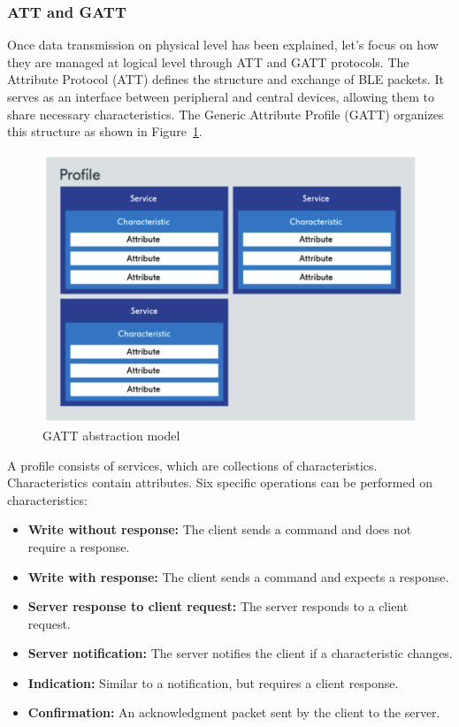 \documentclass{Configuration_Files/PoliMi3i_thesis}
\begin{document}
\subsubsection{ATT and GATT}

Once data transmission on physical level has been explained, let's focus on how they are managed at logical level through ATT and GATT protocols.
The Attribute Protocol (ATT) defines the structure and exchange of BLE packets. It serves as an interface between peripheral and central devices, allowing them to share necessary characteristics. The Generic Attribute Profile (GATT) organizes this structure as shown in Figure~\ref{gatt_model}. 

\begin{figure}[h]
    \centering
    \includegraphics[width=\linewidth]{Bluetooth Low Energy/Screenshot 2024-08-15 at 23.26.01.png}
    \caption{GATT abstraction model \cite{ATTGATTData}}
    \label{gatt_model}
\end{figure}

A profile consists of services, which are collections of characteristics. Characteristics contain attributes. Six specific operations can be performed on characteristics:
\begin{itemize}
    \item \textbf{Write without response:} The client sends a command and does not require a response.
    \item \textbf{Write with response:} The client sends a command and expects a response.
    \item \textbf{Server response to client request:} The server responds to a client request.
    \item \textbf{Server notification:} The server notifies the client if a characteristic changes.
    \item \textbf{Indication:} Similar to a notification, but requires a client response.
    \item \textbf{Confirmation:} An acknowledgment packet sent by the client to the server.
\end{itemize}
\end{document}

